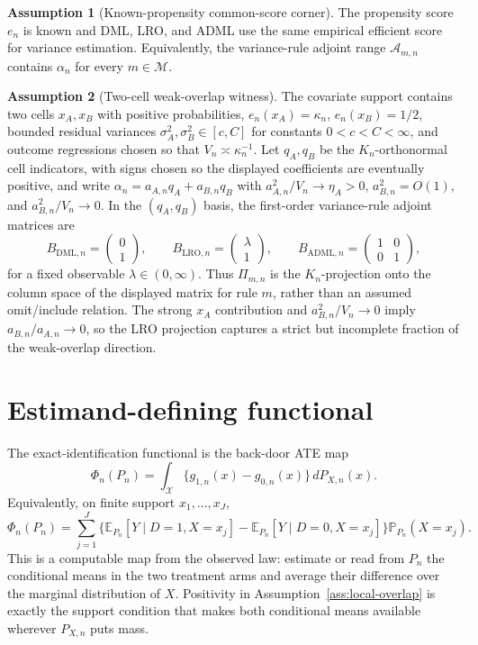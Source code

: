\documentclass[11pt]{article}
\newcommand{\E}{\mathbb{E}}
\renewcommand{\Pr}{\mathbb{P}}
\theoremstyle{definition}
\newtheorem{assumption}{Assumption}
\theoremstyle{plain}
\theoremstyle{remark}
\begin{document}
\begin{assumption}[Known-propensity common-score corner]\label{ass:known-propensity}
The propensity score \(e_n\) is known and DML, LRO, and ADML use the same
empirical efficient score for variance estimation.  Equivalently, the
variance-rule adjoint range \(\mathcal{A}_{m,n}\) contains \(\alpha_n\) for
every \(m\in\mathcal M\).
\end{assumption}

\begin{assumption}[Two-cell weak-overlap witness]\label{ass:two-cell}
The covariate support contains two cells \(x_A,x_B\) with positive probabilities, \(e_n(x_A)=\kappa_n\), \(e_n(x_B)=1/2\), bounded residual variances \(\sigma_A^2,\sigma_B^2\in[c,C]\) for constants \(0<c<C<\infty\), and outcome regressions chosen so that \(V_n\asymp \kappa_n^{-1}\).  Let \(q_A,q_B\) be the \(K_n\)-orthonormal cell indicators, with signs chosen so the displayed coefficients are eventually positive, and write \(\alpha_n=a_{A,n}q_A+a_{B,n}q_B\) with \(a_{A,n}^2/V_n\to\eta_A>0\), \(a_{B,n}^2=O(1)\), and \(a_{B,n}^2/V_n\to0\).  In the \((q_A,q_B)\) basis, the first-order variance-rule adjoint matrices are
\[
  B_{\mathrm{DML},n}=\begin{pmatrix}0\\1\end{pmatrix},\qquad
  B_{\mathrm{LRO},n}=\begin{pmatrix}\lambda\\1\end{pmatrix},\qquad
  B_{\mathrm{ADML},n}=\begin{pmatrix}1&0\\0&1\end{pmatrix},
\]
for a fixed observable \(\lambda\in(0,\infty)\).  Thus \(\Pi_{m,n}\) is the \(K_n\)-projection onto the column space of the displayed matrix for rule \(m\), rather than an assumed omit/include relation.  The strong \(x_A\) contribution and \(a_{B,n}^2/V_n\to0\) imply \(a_{B,n}/a_{A,n}\to0\), so the LRO projection captures a strict but incomplete fraction of the weak-overlap direction.
\end{assumption}

\section{Estimand-defining functional}\label{sec:functional}
The exact-identification functional is the back-door ATE map
\[
  \Phi_n(P_n)=
  \int_{\mathcal X}\{g_{1,n}(x)-g_{0,n}(x)\}\,dP_{X,n}(x).
\]
Equivalently, on finite support \(x_1,\ldots,x_J\),
\[
  \Phi_n(P_n)=
  \sum_{j=1}^J
  \{\E_{P_n}[Y\mid D=1,X=x_j]-\E_{P_n}[Y\mid D=0,X=x_j]\}
  \Pr_{P_n}(X=x_j).
\]
This is a computable map from the observed law: estimate or read from \(P_n\)
the conditional means in the two treatment arms and average their difference
over the marginal distribution of \(X\).  Positivity in
Assumption~\ref{ass:local-overlap} is exactly the support condition that makes
both conditional means available wherever \(P_{X,n}\) puts mass.
\end{document}
